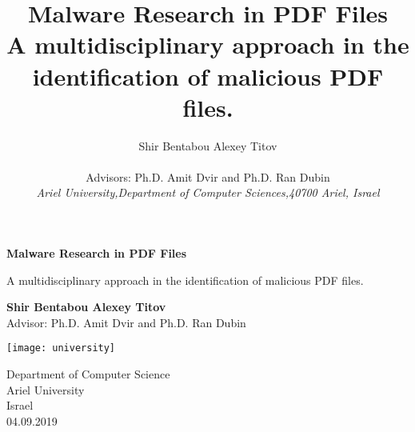 \documentclass{article}
\title{\textbf{Malware Research in PDF Files\\{\small A multidisciplinary approach in the identification of malicious PDF files.}}}
\author{Shir Bentabou \qquad Alexey Titov\\
		\\
		{\normalsize Advisors: Ph.D. Amit Dvir and Ph.D. Ran Dubin}\\
		{\small{\textit{Ariel University,Department of Computer Sciences,40700 Ariel, Israel}}}}
\date{}
\begin{document}
\renewcommand{\thepage}{\arabic{page}}%
\pagecolor{yellow!20}
\begin{titlepage}
    \begin{center}
        \vspace*{1cm}
 
        \Huge
        \textbf{Malware Research in PDF Files}
 
        \vspace{0.5cm}
        \LARGE
        A multidisciplinary approach in the identification of malicious PDF files.
 
        \vspace{1.5cm}
 
        \textbf{Shir Bentabou \qquad Alexey Titov}
        \\
        Advisor: Ph.D. Amit Dvir and Ph.D. Ran Dubin
        \vfill
 
        \vspace{0.8cm}
 
        \texttt{[image: university]}
 
        \Large
        Department of Computer Science\\
        Ariel University\\
        Israel\\
        04.09.2019
 
    \end{center}
\end{titlepage}
\end{document}
